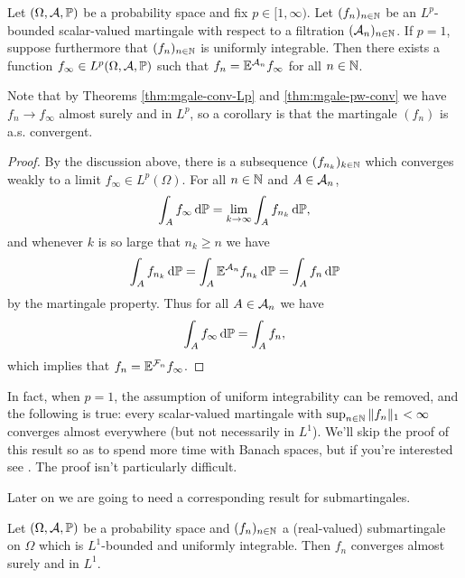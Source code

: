 \begin{thm}\label{thm:mgale-cv-repn}
  Let $(\Omega,\mathcal{A},\mathbb{P})$ be a probability space and fix $p \in [1,\infty)$.
  Let $(f_n)_{n \in \mathbb{N}}$ be an $L^p$-bounded scalar-valued martingale with respect to a filtration $(\mathcal{A}_n)_{n \in \mathbb{N}}$.
  If $p = 1$, suppose furthermore that $(f_n)_{n \in \mathbb{N}}$ is uniformly integrable.
  Then there exists a function $f_\infty \in L^p(\Omega,\mathcal{A},\mathbb{P})$ such that $f_n = \mathbb{E}^{\mathcal{A}_n} f_\infty$ for all $n \in \mathbb{N}$.
\end{thm}

Note that by Theorems \ref{thm:mgale-conv-Lp} and \ref{thm:mgale-pw-conv} we have $f_n \to f_\infty$ almost surely and in $L^p$, so a corollary is that the martingale $(f_n)$ is a.s. convergent.

\begin{proof}
  By the discussion above, there is a subsequence $(f_{n_k})_{k \in \mathbb{N}}$ which converges weakly to a limit $f_\infty \in L^p(\Omega)$.
  For all $n \in \mathbb{N}$ and $A \in \mathcal{A}_n$,
  \begin{equation*}
    \int_A f_\infty \, \mathrm{d}\mathbb{P} = \lim_{k \to \infty} \int_A f_{n_k} \, \mathrm{d}\mathbb{P},
  \end{equation*}
  and whenever $k$ is so large that $n_k \geq n$ we have
  \begin{equation*}
    \int_A f_{n_k} \, \mathrm{d}\mathbb{P} = \int_A \mathbb{E}^{\mathcal{A}_n} f_{n_k} \, \mathrm{d} \mathbb{P} = \int_A f_{n} \, \mathrm{d}\mathbb{P}
  \end{equation*}
  by the martingale property.
  Thus for all $A \in \mathcal{A}_n$ we have
  \begin{equation*}
    \int_A f_\infty \, \mathrm{d}\mathbb{P} = \int_A f_n,
  \end{equation*}
  which implies that $f_n = \mathbb{E}^{\mathcal{F}_n} f_\infty$.
\end{proof}

\begin{rmk}\label{rmk:mgale-cv-p1}
  In fact, when $p = 1$, the assumption of uniform integrability can be removed, and the following is true: every scalar-valued martingale with $\sup_{n \in \mathbb{N}} \|f_n\|_1 < \infty$ converges almost everywhere (but not necessarily in $L^1$).
  We'll skip the proof of this result so as to spend more time with Banach spaces, but if you're interested see \cite[Theorem 1.34]{gP16}.
  The proof isn't particularly difficult.
\end{rmk}

Later on we are going to need a corresponding result for submartingales.

\begin{thm}\label{thm:submartingale-convergence}
  Let $(\Omega,\mathcal{A},\mathbb{P})$ be a probability space and $(f_n)_{n \in \mathbb{N}}$ a (real-valued) submartingale on $\Omega$ which is $L^1$-bounded and uniformly integrable.
  Then $f_n$ converges almost surely and in $L^1$.
\end{thm}

